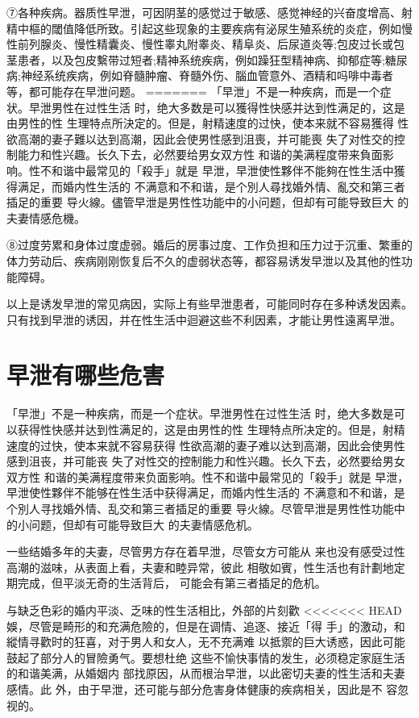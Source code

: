 \documentclass[12pt,UTF8]{ctexbook}
\begin{document}
⑦各种疾病。器质性早泄，可因阴茎的感觉过于敏感、感觉神经的兴奋度增高、射精中樞的閾值降低所致。引起这些现象的主要疾病有泌尿生殖系统的炎症，例如慢性前列腺炎、慢性精囊炎、慢性睾丸附睾炎、精阜炎、后尿道炎等;包皮过长或包茎患者，以及包皮繫带过短者;精神系统疾病，例如躁狂型精神病、抑郁症等;糖尿病;神经系统疾病，例如脊髓肿瘤、脊髓外伤、腦血管意外、酒精和吗啡中毒者等，都可能存在早泄问题。
=======
「早泄」不是一种疾病，而是一个症状。早泄男性在过性生活
时，绝大多数是可以獲得性快感并达到性满足的，这是由男性的性
生理特点所決定的。但是，射精速度的过快，使本来就不容易獲得
性欲高潮的妻子難以达到高潮，因此会使男性感到沮喪，并可能喪
失了对性交的控制能力和性兴趣。长久下去，必然要给男女双方性
和谐的美满程度带来負面影响。性不和谐中最常见的「殺手」就是
早泄，早泄使性夥伴不能夠在性生活中獲得满足，而婚内性生活的
不满意和不和谐，是个別人尋找婚外情、亂交和第三者插足的重要
导火線。儘管早泄是男性性功能中的小问题，但却有可能导致巨大
的夫妻情感危機。

⑧过度劳累和身体过度虚弱。婚后的房事过度、工作负担和压力过于沉重、繁重的体力劳动后、疾病刚刚恢复后不久的虚弱状态等，都容易诱发早泄以及其他的性功能障碍。

以上是诱发早泄的常见病因，实际上有些早泄患者，可能同时存在多种诱发因素。只有找到早泄的诱因，并在性生活中迴避这些不利因素，才能让男性遠离早泄。

\section{早泄有哪些危害}

「早泄」不是一种疾病，而是一个症状。早泄男性在过性生活
时，绝大多数是可以获得性快感并达到性满足的，这是由男性的性
生理特点所决定的。但是，射精速度的过快，使本来就不容易获得
性欲高潮的妻子难以达到高潮，因此会使男性感到沮丧，并可能丧
失了对性交的控制能力和性兴趣。长久下去，必然要给男女双方性
和谐的美满程度带来负面影响。性不和谐中最常见的「殺手」就是
早泄，早泄使性夥伴不能够在性生活中获得满足，而婚内性生活的
不满意和不和谐，是个別人寻找婚外情、乱交和第三者插足的重要
导火線。尽管早泄是男性性功能中的小问题，但却有可能导致巨大
的夫妻情感危机。

一些结婚多年的夫妻，尽管男方存在着早泄，尽管女方可能从
来也没有感受过性高潮的滋味，从表面上看，夫妻和睦异常，彼此
相敬如賓，性生活也有計劃地定期完成，但平淡无奇的生活背后，
可能会有第三者插足的危机。

与缺乏色彩的婚内平淡、乏味的性生活相比，外部的片刻歡
<<<<<<< HEAD
娛，尽管是畸形的和充满危險的，但是在调情、追逐、接近「得
手」的激动，和縱情寻歡时的狂喜，对于男人和女人，无不充满难
以抵禦的巨大诱惑，因此可能鼓起了部分人的冒險勇气。要想杜绝
这些不愉快事情的发生，必须稳定家庭生活的和谐美满，从婚姻内
部找原因，从而根治早泄，以此密切夫妻的性生活和夫妻感情。此
外，由于早泄，还可能与部分危害身体健康的疾病相关，因此是不
容忽视的。
\end{document}
